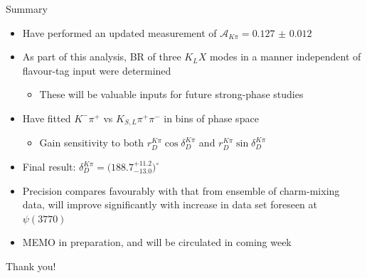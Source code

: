 \documentclass{beamer}
\begin{document}
\begin{frame}{Summary}
  \begin{itemize}
    \item{Have performed an updated measurement of $\mathcal{A}_{K\pi} = \SI{0.127(12)}{}$}
    \item{As part of this analysis, BR of three $K_LX$ modes in a manner independent of flavour-tag input were determined}
    \begin{itemize}
      \item{These will be valuable inputs for future strong-phase studies}
    \end{itemize}
    \item{Have fitted $K^-\pi^+$ vs $K_{S, L}\pi^+\pi^-$ in bins of phase space}
    \begin{itemize}
      \item{Gain sensitivity to both $r_D^{K\pi}\cos\delta_D^{K\pi}$ and $r_D^{K\pi}\sin\delta_D^{K\pi}$}
    \end{itemize}
    \item{Final result: $\delta_D^{K\pi} = \big(188.7^{+11.2}_{-13.0}\big)^\circ$}
    \item{Precision compares favourably with that from ensemble of charm-mixing data, will improve significantly with increase in data set foreseen at $\psi(3770)$}
    \item{MEMO in preparation, and will be circulated in coming week}
  \end{itemize}
  \begin{center}
    {\huge Thank you!}
  \end{center}
\end{frame}
    
\end{document}
